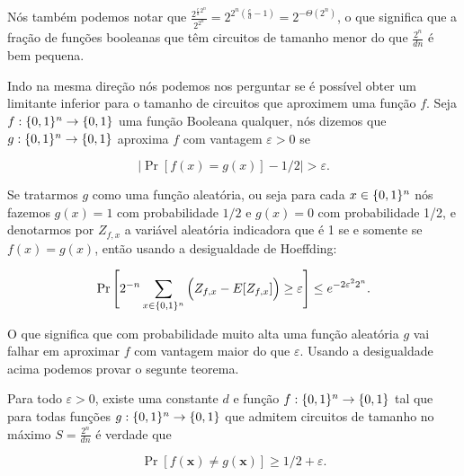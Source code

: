 Nós também podemos notar que $\frac{2^{\frac{c}{d}2^{n}}}{2^{2^{n}}} = 2^{2^{n}(\frac{c}{d} - 1)} = 2^{-\Theta(2^{n})}$, o que significa que a fração de funções booleanas que têm circuitos de tamanho menor do que $\frac{2^{n}}{dn}$ é bem pequena.

Indo na mesma direção nós podemos nos perguntar se é possível obter um limitante inferior para o tamanho de circuitos que aproximem uma função $f$. Seja $f: \{0, 1\}^{n} \to \{0, 1\}$ uma função Booleana qualquer, nós dizemos que $g: \{0, 1\}^{n} \to \{0, 1\}$ aproxima $f$ com vantagem $\varepsilon > 0$ se

\begin{equation*}
    \big\lvert \Pr[f(x) = g(x)] - 1/2 \big\rvert > \varepsilon.
\end{equation*}

Se tratarmos $g$ como uma função aleatória, ou seja para cada $x \in \{0, 1\}^{n}$ nós fazemos $g(x) = 1$ com probabilidade $1/2$ e $g(x) = 0$ com probabilidade 1/2, e denotarmos por $Z_{f, x}$ a variável aleatória indicadora que é 1 se e somente se $f(x) = g(x)$, então usando a desigualdade de Hoeffding:

\begin{equation} \label{random_function_likely_far}
    \Pr\Bigg[2^{-n} \sum_{x \in \{0, 1\}^{n}} \Big( Z_{f, x} - E[Z_{f, x}] \Big) \geq \varepsilon \Bigg] \leq e^{-2\varepsilon^{2}2^{n}}.
\end{equation}

O que significa que com probabilidade muito alta uma função aleatória $g$ vai falhar em aproximar $f$ com vantagem maior do que $\varepsilon$. Usando a desigualdade acima podemos provar o segunte teorema.

\begin{teo} \label{ckt_lower_bound_approx}

    Para todo $\varepsilon > 0$, existe uma constante $d$ e função $f: \{0, 1\}^{n} \to \{0, 1\}$ tal que para todas funções $g: \{0, 1\}^{n} \to \{0, 1\}$ que admitem circuitos de tamanho no máximo $S = \frac{2^{n}}{dn}$ é verdade que
    
    \begin{equation*}
        \Pr[f(\boldsymbol{x}) \neq g(\boldsymbol{x})] \geq 1/2 + \varepsilon.
    \end{equation*}

\end{teo}

